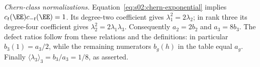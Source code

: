 \begin{prf}
\smallskip\noindent
\emph{Chern-class normalizations.}
Equation~\eqref{eq:s02:chern-exponential} implies
$c_t(\EE)c_{-t}(\EE)=1$. Its degree-two coefficient gives
$\lambda_1^2=2\lambda_2$; in rank three its degree-four coefficient
gives $\lambda_2^2=2\lambda_1\lambda_3$. Consequently
$a_2=2b_2$ and $a_3=8b_3$.
The defect ratios follow from these relations and the definitions:
in particular $b_3(1)=a_3/2$, while the remaining numerators
$b_g(h)$ in the table equal $a_g$. Finally
$\langle\lambda_3\rangle_3=b_3/a_3=1/8$, as asserted.
\end{prf}
